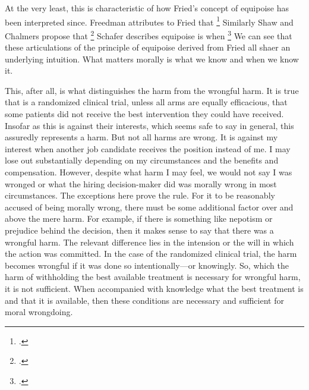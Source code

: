 \documentclass[letterpaper,notitlepage,12pt]{article}
\begin{document}
{At the very least, this is characteristic of how Fried's concept of equipoise
has been interpreted since.
Freedman attributes to Fried that \footcite[p.
141]{freedman_equipoise_1987}
Similarly Shaw and Chalmers propose that \footcite[p.487]{shaw_ethics_1970}
Schafer describes equipoise is when \footcite[p.
4]{schafer_commentary_1985}
We can see that these articulations of the principle of equipoise derived
from Fried all shaer an underlying intuition.
What matters morally is what we know and when we know it.

This, after all, is what distinguishes the harm from the wrongful harm.
It is true that is a randomized clinical trial, unless all arms are equally
efficacious, that some patients did not receive the best intervention they could
have received.
Insofar as this is against their interests, which seems safe to say in general,
this assuredly represents a harm.
But not all harms are wrong.
It is against my interest when another job candidate receives the position
instead of me.
I may lose out substantially depending on my circumstances and the benefits and
compensation.
However, despite what harm I may feel, we would not say I was wronged or what
the hiring decision-maker did was morally wrong in most circumstances.
The exceptions here prove the rule.
For it to be reasonably accused of being morally wrong, there must be some
additional factor over and above the mere harm.
For example, if there is something like nepotism or prejudice behind the
decision, then it makes sense to say that there was a wrongful harm.
The relevant difference lies in the intension or the will in which the action
was committed.
In the case of the randomized clinical trial, the harm becomes wrongful if it
was done so intentionally---or knowingly.
So, which the harm of withholding the best available treatment is necessary for
wrongful harm, it is not sufficient.
When accompanied with knowledge what the best treatment is and that it is
available, then these conditions are necessary and sufficient for moral
wrongdoing.

}
\end{document}
